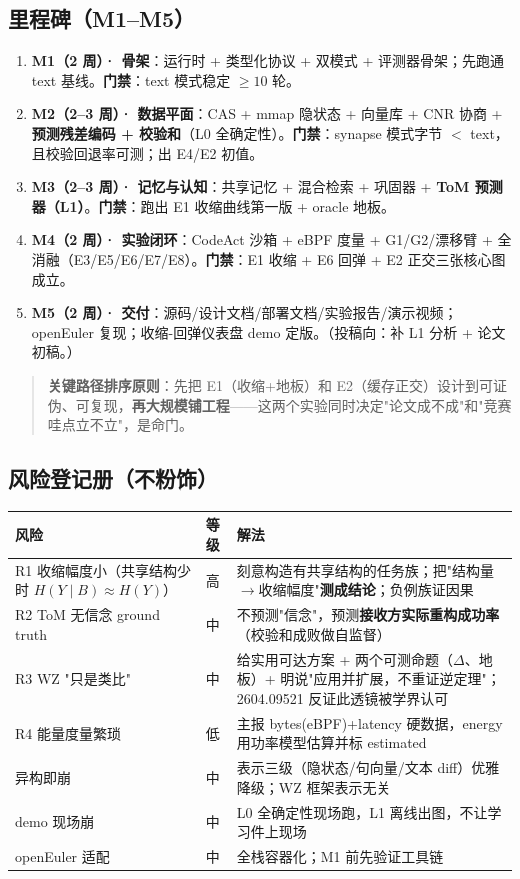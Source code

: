 \documentclass[UTF8,fontset=windows,11pt]{ctexart}
\newcommand{\key}[1]{\textbf{\textcolor{NavyBlue}{#1}}}
\begin{document}
\subsection{里程碑（M1--M5）}
\begin{enumerate}
\item \key{M1（2 周）· 骨架}：运行时 + 类型化协议 + 双模式 + 评测器骨架；先跑通 text 基线。\textbf{门禁}：text 模式稳定 $\ge10$ 轮。
\item \key{M2（2--3 周）· 数据平面}：CAS + mmap 隐状态 + 向量库 + CNR 协商 + \textbf{预测残差编码 + 校验和}（L0 全确定性）。\textbf{门禁}：synapse 模式字节 $<$ text，且校验回退率可测；出 E4/E2 初值。
\item \key{M3（2--3 周）· 记忆与认知}：共享记忆 + 混合检索 + 巩固器 + \textbf{ToM 预测器（L1）}。\textbf{门禁}：跑出 E1 收缩曲线第一版 + oracle 地板。
\item \key{M4（2 周）· 实验闭环}：CodeAct 沙箱 + eBPF 度量 + G1/G2/漂移臂 + 全消融（E3/E5/E6/E7/E8）。\textbf{门禁}：E1 收缩 + E6 回弹 + E2 正交三张核心图成立。
\item \key{M5（2 周）· 交付}：源码/设计文档/部署文档/实验报告/演示视频；openEuler 复现；收缩-回弹仪表盘 demo 定版。（投稿向：补 L1 分析 + 论文初稿。）
\end{enumerate}
\begin{quote}\small
\textbf{关键路径排序原则}：先把 E1（收缩+地板）和 E2（缓存正交）设计到可证伪、可复现，\textbf{再大规模铺工程}——这两个实验同时决定"论文成不成"和"竞赛哇点立不立"，是命门。
\end{quote}

\subsection{风险登记册（不粉饰）}
\begin{table}[h]\small\centering
\renewcommand{\arraystretch}{1.22}
\begin{tabularx}{\linewidth}{@{}p{4.0cm}p{1.0cm}Y@{}}
\toprule
\textbf{风险} & \textbf{等级} & \textbf{解法} \\
\midrule
R1 收缩幅度小（共享结构少时 $H(Y\mid B)\approx H(Y)$） & 高 & 刻意构造有共享结构的任务族；把"结构量$\to$收缩幅度"\textbf{测成结论}；负例族证因果 \\
R2 ToM 无信念 ground truth & 中 & 不预测"信念"，预测\textbf{接收方实际重构成功率}（校验和成败做自监督） \\
R3 WZ "只是类比" & 中 & 给实用可达方案 + 两个可测命题（$\Delta$、地板）+ 明说"应用并扩展，不重证逆定理"；2604.09521 反证此透镜被学界认可 \\
R4 能量度量繁琐 & 低 & 主报 bytes(eBPF)+latency 硬数据，energy 用功率模型估算并标 estimated \\
异构即崩 & 中 & 表示三级（隐状态/句向量/文本 diff）优雅降级；WZ 框架表示无关 \\
demo 现场崩 & 中 & L0 全确定性现场跑，L1 离线出图，不让学习件上现场 \\
openEuler 适配 & 中 & 全栈容器化；M1 前先验证工具链 \\
\bottomrule
\end{tabularx}
\end{table}
\end{document}
